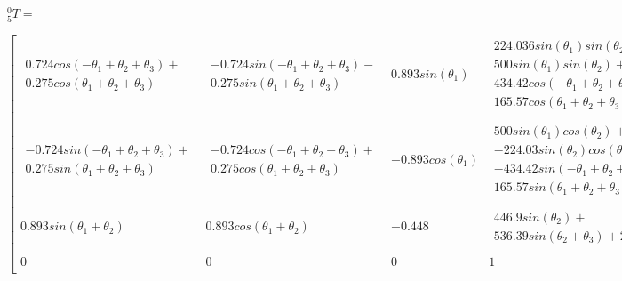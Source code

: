 \documentclass[transmag]{IEEEtran}
\begin{document}
\begin{figure}
\begin{center}
$^0_5T = $
\end{center}
\begin{equation}
\begin{bmatrix}
\begin{matrix}
0.724 cos(-\theta_1 + \theta_2 + \theta_3) + \\ 
0.275 cos(\theta_1 + \theta_2 + \theta_3)
\end{matrix}
& 
\begin{matrix}
-0.724 sin(-\theta_1 + \theta_2 + \theta_3) - \\
0.275 sin(\theta_1 + \theta_2 + \theta_3)
\end{matrix}
& 

0.893 sin(\theta_1)

& 
\begin{matrix}
224.036 sin(\theta_1) sin(\theta_2) +\\
500 sin(\theta_1) sin(\theta_2) + \\
434.42 cos(-\theta_1 + \theta_2 + \theta_3) + \\
165.57 cos(\theta_1 + \theta_2 + \theta_3)
\end{matrix} 
\\
&&&&
\\
\begin{matrix}
-0.724 sin(-\theta_1 + \theta_2 + \theta_3) + \\ 
0.275 sin(\theta_1 + \theta_2 + \theta_3)
\end{matrix}
& 
\begin{matrix}
-0.724 cos(-\theta_1 + \theta_2 + \theta_3) + \\
0.275 cos(\theta_1 + \theta_2 + \theta_3)
\end{matrix}
& 

-0.893 cos(\theta_1)

& 
\begin{matrix}
500 sin(\theta_1) cos(\theta_2) +\\
-224.03 sin(\theta_2) cos(\theta_1) + \\
-434.42 sin(-\theta_1 + \theta_2 + \theta_3) + \\
165.57 sin(\theta_1 + \theta_2 + \theta_3)
\end{matrix} 
\\
&&&&
\\
0.893 sin(\theta_1 + \theta_2)      & 0.893 cos(\theta_1 + \theta_2)            & -0.448      
&
\begin{matrix}
446.9 sin(\theta_2) + \\
536.39 sin(\theta_2 + \theta_3) +220
\end{matrix}
\\
&&&&
\\
0           & 0            & 0      & 1   \\
\end{bmatrix}
\end{equation}
\end{figure}
\end{document}
